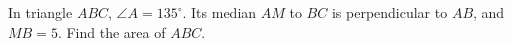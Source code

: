 In triangle $ABC$, $\angle A=135^\circ$. Its median $AM$ to $BC$ is perpendicular to $AB$, and $MB=5$. Find the area of $ABC$.
